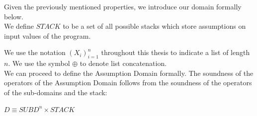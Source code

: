 \documentclass[10pt]{report}
\begin{document}
Given the previously mentioned properties, we introduce our domain formally below. \\
  

We define $STACK$ to be a set of all possible stacks which store assumptions on input values of the program.

We use the notation $ (X_{i})_{i=1}^{n} $ throughout this thesis to indicate a list of length $ n $. We use the symbol $ \oplus $ to denote list concatenation. \\

We can proceed to define the Assumption Domain formally. The soundness of the operators of the Assumption Domain follows from the soundness of the operators of the sub-domains and the stack: \\
\begin{center}
	$D \equiv SUBD^{n} \times STACK$\\	
\end{center}
\end{document}

